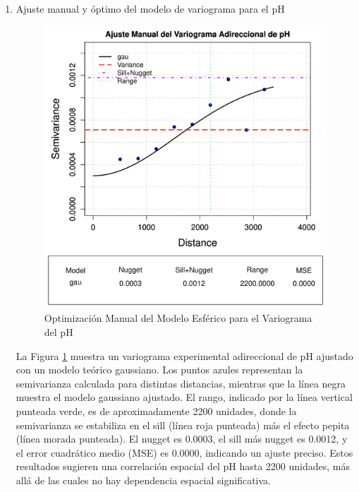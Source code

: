 \begin{enumerate}
\item Ajuste manual y óptimo del modelo de variograma para el pH
\begin{figure}[!htb]
    \centering
    \includegraphics[width=0.8\linewidth]{Figuras_AED/VARIOGRAFICO/ph_VarioEyeEstimation.pdf}
    \caption{ Optimización Manual del Modelo Esférico para el  Variograma del pH}
    \label{fig:enter-labeldezxc}
\end{figure}

La Figura \ref{fig:enter-labeldezxc} muestra un variograma experimental adireccional de pH ajustado con un modelo teórico gaussiano. Los puntos azules representan la semivarianza calculada para distintas distancias, mientras que la línea negra muestra el modelo gaussiano ajustado. El rango, indicado por la línea vertical punteada verde, es de aproximadamente 2200 unidades, donde la semivarianza se estabiliza en el sill (línea roja punteada) más el efecto pepita (línea morada punteada). El nugget es 0.0003, el sill más nugget es 0.0012, y el error cuadrático medio (MSE) es 0.0000, indicando un ajuste preciso. Estos resultados sugieren una correlación espacial del pH hasta 2200 unidades, más allá de las cuales no hay dependencia espacial significativa.

 
\end{enumerate}

